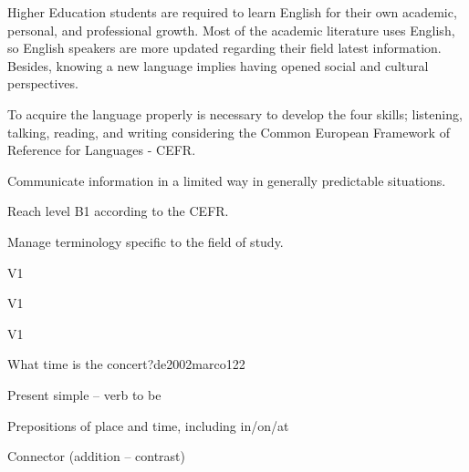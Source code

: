 \begin{syllabus}


\begin{justification}
Higher Education students are required to learn English for their own academic, 
personal, and professional growth. Most of the academic literature uses English, 
so English speakers are more updated regarding their field latest information. 
Besides, knowing a new language implies having opened social and 
cultural perspectives.  

To acquire the language properly is necessary to develop the four skills;
listening, talking, reading, and writing considering the 
Common European Framework of Reference for Languages - CEFR.
\end{justification}

\begin{goals}
\item Communicate information in a limited way in generally predictable situations.
\item Reach level B1 according to the CEFR.
\item Manage terminology specific to the field of study.
\end{goals}

\begin{outcomes}{V1}
\item {}
\end{outcomes}

\begin{specificoutcomes}{V1}
\item {}
\item {}
\item {}
\item {}
\end{specificoutcomes}

\begin{competences}{V1}
 \item {}
\end{competences}

\begin{unit}{What time is the concert?}{}{de2002marco}{12}{2}
   \begin{topics}
      \item Present simple – verb to be
      \item Prepositions of place and time, including in/on/at
      \item Connector (addition – contrast)
   \end{topics}


\end{unit}
\end{syllabus}
